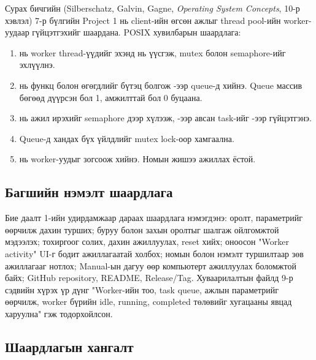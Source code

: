 \documentclass[12pt,a4paper]{article}
\begin{document}
Сурах бичгийн (Silberschatz, Galvin, Gagne, \textit{Operating System Concepts}, 10-р хэвлэл) 7-р бүлгийн Project 1 нь client-ийн өгсөн ажлыг thread pool-ийн worker-уудаар гүйцэтгэхийг шаардана. POSIX хувилбарын шаардлага:

\begin{enumerate}
  \item {} нь worker thread-үүдийг эхэнд нь үүсгэж, mutex болон semaphore-ийг эхлүүлнэ.
  \item {} нь функц болон өгөгдлийг  бүтэц болгож -ээр queue-д хийнэ. Queue массив бөгөөд дүүрсэн бол 1, амжилттай бол 0 буцаана.
  \item {} нь ажил ирэхийг semaphore дээр хүлээж, -ээр авсан task-ийг -ээр гүйцэтгэнэ.
  \item Queue-д хандах бүх үйлдлийг mutex lock-оор хамгаална.
  \item {} нь worker-уудыг зогсоож  хийнэ. Номын  жишээ ажиллах ёстой.
\end{enumerate}

\subsection{Багшийн нэмэлт шаардлага}

Бие даалт 1-ийн удирдамжаар дараах шаардлага нэмэгдэнэ: оролт, параметрийг өөрчилж дахин турших; буруу болон захын оролтыг шалгаж ойлгомжтой мэдээлэх; тохиргоог солих, дахин ажиллуулах, reset хийх; оноосон "Worker activity" UI-г бодит ажиллагаатай холбох; номын болон нэмэлт туршилтаар зөв ажиллагааг нотлох; Manual-ын дагуу өөр компьютерт ажиллуулах боломжтой байх; GitHub repository, README, Release/Tag. Хуваарилалтын файлд 9-р сэдвийн хүрэх үр дүнг "Worker-ийн тоо, task queue, ажлын параметрийг өөрчилж, worker бүрийн idle, running, completed төлөвийг хугацааны явцад харуулна" гэж тодорхойлсон.

\subsection{Шаардлагын хангалт}
\end{document}
